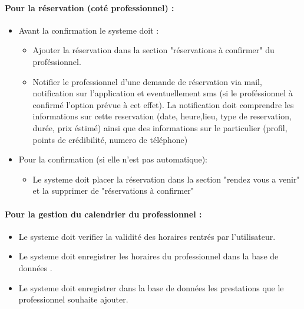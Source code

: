 \documentclass{article}
\begin{document}
\paragraph{Pour la réservation (coté professionnel) :}
\begin{itemize}
\item Avant la confirmation le systeme doit :
	\begin{itemize}
	\item Ajouter la réservation dans la section "réservations à confirmer" du  proféssionnel.
    \item Notifier le professionnel d'une demande de réservation via mail, notification sur l'application et eventuellement sms (si le proféssionnel à confirmé l'option prévue à cet effet).
		La notification doit comprendre les informations sur cette reservation (date, heure,lieu, type de reservation, durée, prix éstimé)
		ainsi que des informations sur le particulier (profil, points de crédibilité, numero de téléphone)
	\end{itemize}
\item Pour la confirmation (si elle n'est pas automatique):
	\begin{itemize}
	\item Le systeme doit placer la réservation dans la section "rendez vous a venir" et la supprimer de "réservations à confirmer"
	\end{itemize}
\end{itemize}






\paragraph{Pour la gestion du calendrier du professionnel :}
\begin{itemize}
\item Le systeme doit verifier la validité des horaires rentrés par l'utilisateur.
\item Le systeme doit enregistrer les horaires du professionnel dans
  la base de données .
\item Le systeme doit enregistrer dans la base de données les prestations que le professionnel souhaite ajouter.
\end{itemize}
\end{document}
